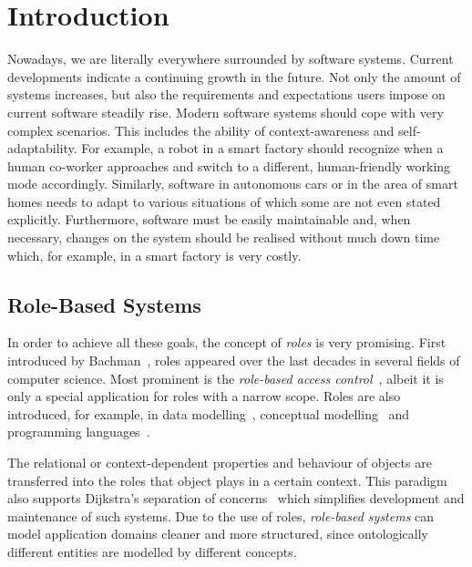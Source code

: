 
\chapter{Introduction}
\label{ch:introduction}

Nowadays, we are literally everywhere surrounded by software systems. Current developments indicate
a continuing growth in the future.  Not only the amount of systems increases, but also the
requirements and expectations users impose on current software steadily rise. Modern software
systems should cope with very complex scenarios. This includes the ability of context-awareness and
self-adaptability. For example, a robot in a smart factory should recognize when a human co-worker
approaches and switch to a different, human-friendly working mode accordingly. Similarly, software
in autonomous cars or in the area of smart homes needs to adapt to various situations of which some
are not even stated explicitly.
%
Furthermore, software must be easily maintainable and, when necessary, changes on the system should be realised
without much down time which, for example, in a smart factory is very costly. 

\section{Role-Based Systems}
\label{sec:intro-role-based-systems}

In order to achieve all these goals, the concept of \emph{roles} is very promising. First introduced
by Bachman~\cite{BaD-VLDB77}, roles appeared over the last decades in several fields of computer
science. Most prominent is the \emph{role-based access
  control}~\cite{FeKC-RBAC03,AlFe-ECS11,SaCF-IEEE96}, albeit it is only a special application for
roles with a narrow scope. Roles are also introduced, for example, in data
modelling~\cite{Ha-ORM2006}, conceptual modelling~\cite{Stei-DKE00,Gui-PHD05,Stei-AO07} and
programming languages~\cite{BaBT-SAC06,Herr-AO07,BaGE-ECOOP07}.

The relational or context-dependent properties and behaviour of objects are transferred into the
roles that object plays in a certain context. This paradigm also supports Dijkstra's separation of
concerns~\cite{Dij-SelWrCom82} which simplifies development and maintenance of such systems.  Due to
the use of roles, \emph{role-based systems} can model application domains cleaner and more
structured, since ontologically different entities are modelled by different concepts.

